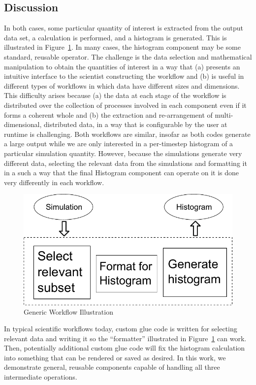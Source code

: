 \documentclass[conference]{IEEEtran}
\begin{document}
\subsection{Discussion}

In both cases, some particular quantity of interest is extracted from the
output data set, a calculation is performed, and a histogram is
generated. This is illustrated in Figure~\ref{fig:generic-workflow}. In many
cases, the histogram component may be some standard, reusable operator.
The challenge is the data selection and mathematical
manipulation to obtain the quantities of interest in a way that (a) presents an
intuitive interface to the scientist constructing the workflow and (b) is
useful in different types of workflows in which data have different sizes and
dimensions.  This difficulty arises because (a) the data at each stage of the
workflow is distributed over the collection of processes involved in each
component even if it forms a coherent whole and (b) the extraction and
re-arrangement of multi-dimensional, distributed data, in a way that is
configurable by the user at runtime is challenging.  Both workflows are
similar, insofar as both codes generate a large output while we are only
interested in a per-timestep histogram of a particular simulation quantity.
However, because the simulations generate very different data, selecting the
relevant data from the simulations and formatting it in a such a way that the
final Histogram component can operate on it is done very differently in each
workflow.

\begin{figure}[htbp]
\vspace{-0.10in}
\centering
\includegraphics[width=0.7\columnwidth]{fig/gwflow}
\vspace{-0.15in}
\caption{Generic Workflow Illustration}
\label{fig:generic-workflow}
\vspace{-0.25in}
\end{figure}

In typical scientific workflows today, custom glue code is written for
selecting relevant data and writing it so the ``formatter'' illustrated in
Figure~\ref{fig:generic-workflow} can work.  Then, potentially additional
custom glue code will fix the histogram calculation into something that can be
rendered or saved as desired.  In this work, we demonstrate general, reusable
components capable of handling all three intermediate operations.
\end{document}
